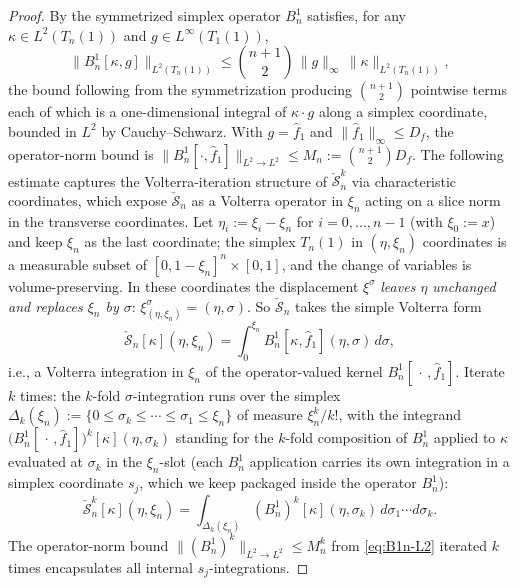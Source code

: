 \documentclass[journal,twoside,web]{ieeecolor}
\begin{document}
\begin{proof}
By \cite[Lemma~A.1]{HV1} the symmetrized simplex operator $B^1_n$ satisfies, for any $\kappa\in L^2(T_n(1))$ and $g\in L^\infty(T_1(1))$,
\begin{equation}\label{eq:B1n-L2}
\|B^1_n[\kappa,g]\|_{L^2(T_n(1))}\le \binom{n+1}{2}\,\|g\|_\infty\,\|\kappa\|_{L^2(T_n(1))},
\end{equation}
the bound following from the symmetrization producing $\binom{n+1}{2}$ pointwise terms each of which is a one-dimensional integral of $\kappa\cdot g$ along a simplex coordinate, bounded in $L^2$ by Cauchy--Schwarz. With $g=\hat f_1$ and $\|\hat f_1\|_\infty\le D_f$, the operator-norm bound is $\|B^1_n[\cdot,\hat f_1]\|_{L^2\to L^2}\le M_n:=\binom{n+1}{2}D_f$.
The following estimate captures the Volterra-iteration structure of $\check{\mathcal S}_n^k$ via characteristic coordinates, which expose $\check{\mathcal S}_n$ as a Volterra operator in $\xi_n$ acting on a slice norm in the transverse coordinates. Let $\eta_i:=\xi_i-\xi_n$ for $i=0,\ldots,n-1$ (with $\xi_0:=x$) and keep $\xi_n$ as the last coordinate; the simplex $T_n(1)$ in $(\eta,\xi_n)$ coordinates is a measurable subset of $[0,1-\xi_n]^n\times[0,1]$, and the change of variables is volume-preserving. In these coordinates the displacement $\xi^\sigma$ \emph{leaves $\eta$ unchanged and replaces $\xi_n$ by $\sigma$}: $\xi^\sigma_{(\eta,\xi_n)}=(\eta,\sigma)$. So $\check{\mathcal S}_n$ takes the simple Volterra form
\begin{equation}\label{eq:Sn-char-coords}
\check{\mathcal S}_n[\kappa](\eta,\xi_n)=\int_0^{\xi_n}B^1_n[\kappa,\hat f_1](\eta,\sigma)\,d\sigma,
\end{equation}
i.e., a Volterra integration in $\xi_n$ of the operator-valued kernel $B^1_n[\,\cdot\,,\hat f_1]$.
Iterate $k$ times: the $k$-fold $\sigma$-integration runs over the simplex $\Delta_k(\xi_n):=\{0\le\sigma_k\le\cdots\le\sigma_1\le\xi_n\}$ of measure $\xi_n^k/k!$, with the integrand $\bigl(B^1_n[\,\cdot\,,\hat f_1]\bigr)^k[\kappa](\eta,\sigma_k)$ standing for the $k$-fold composition of $B^1_n$ applied to $\kappa$ evaluated at $\sigma_k$ in the $\xi_n$-slot (each $B^1_n$ application carries its own integration in a simplex coordinate $s_j$, which we keep packaged inside the operator $B^1_n$):
\begin{equation}\label{eq:Sn-iter-form}
\check{\mathcal S}_n^k[\kappa](\eta,\xi_n)=\int_{\Delta_k(\xi_n)}(B^1_n)^k[\kappa](\eta,\sigma_k)\,d\sigma_1\cdots d\sigma_k.
\end{equation}
The operator-norm bound $\|(B^1_n)^k\|_{L^2\to L^2}\le M_n^k$ from \eqref{eq:B1n-L2} iterated $k$ times encapsulates all internal $s_j$-integrations.

\end{proof}
\end{document}
